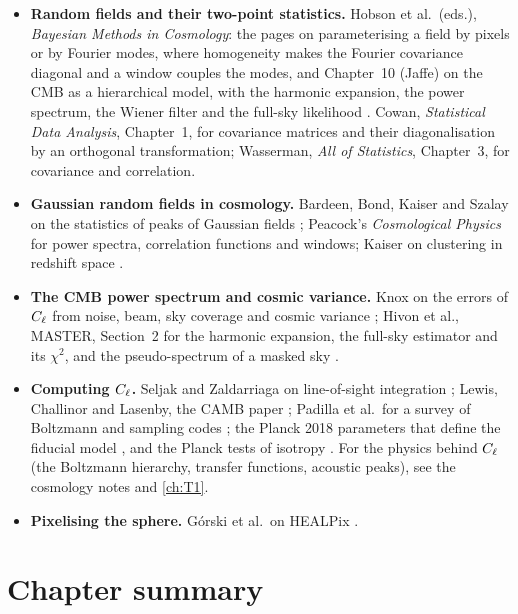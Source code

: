 \begin{itemize}[itemsep=2pt,leftmargin=1.2em]
  \item \textbf{Random fields and their two-point statistics.} Hobson et al.\ (eds.),
        \emph{Bayesian Methods in Cosmology}: the pages on parameterising a field by pixels or
        by Fourier modes, where homogeneity makes the Fourier covariance diagonal and a window
        couples the modes, and Chapter~10 (Jaffe) on the CMB as a hierarchical model, with the
        harmonic expansion, the power spectrum, the Wiener filter and the full-sky likelihood
        . Cowan, \emph{Statistical Data Analysis}, Chapter~1,
        for covariance matrices and their diagonalisation by an orthogonal transformation;
        Wasserman, \emph{All of Statistics}, Chapter~3, for covariance and correlation.
  \item \textbf{Gaussian random fields in cosmology.} Bardeen, Bond, Kaiser and Szalay on the
        statistics of peaks of Gaussian fields \cite{BBKS1986}; Peacock's \emph{Cosmological
        Physics} \cite{Peacock1999} for power spectra, correlation functions and windows; Kaiser
        on clustering in redshift space \cite{Kaiser1987}.
  \item \textbf{The CMB power spectrum and cosmic variance.} Knox on the errors of $C_\ell$ from
        noise, beam, sky coverage and cosmic variance \cite{Knox1995}; Hivon et al., MASTER,
        Section~2 for the harmonic expansion, the full-sky estimator and its $\chi^2$, and the
        pseudo-spectrum of a masked sky \cite{Hivon2002}.
  \item \textbf{Computing $C_\ell$.} Seljak and Zaldarriaga on line-of-sight integration
        \cite{Seljak1996}; Lewis, Challinor and Lasenby, the CAMB paper \cite{CAMB2000}; Padilla
        et al.\ for a survey of Boltzmann and sampling codes \cite{Padilla2019}; the Planck 2018
        parameters that define the fiducial model \cite{Planck2018VI}, and the Planck tests
        of isotropy \cite{Planck2018VII}. For the physics behind $C_\ell$ (the Boltzmann hierarchy,
        transfer functions, acoustic peaks), see the cosmology notes and \cref{ch:T1}.
  \item \textbf{Pixelising the sphere.} G\'orski et al.\ on HEALPix \cite{Gorski2005}.
\end{itemize}

\section*{Chapter summary}
\label{7b:sec:summary}

